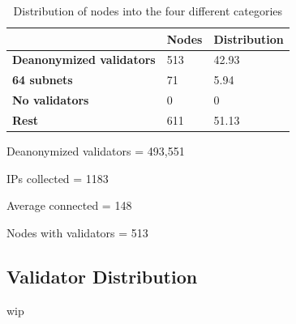 \begin{table}[]
    \centering
    \caption{Distribution of nodes into the four different categories}
    \begin{tabular}{|l|l|l|}
        \hline
        & \textbf{Nodes} & \textbf{Distribution} \\ \hline
        \textbf{Deanonymized validators} & 513            & 42.93                 \\ \hline
        \textbf{64 subnets}              & 71             & 5.94                  \\ \hline
        \textbf{No validators}           & 0              & 0                     \\ \hline
        \textbf{Rest}                    & 611            & 51.13                 \\ \hline
    \end{tabular}
    \label{tab:distribution}
\end{table}


Deanonymized validators = 493,551

IPs collected = 1183

Average connected = 148

Nodes with validators = 513

\subsection{Validator Distribution}\label{subsec:validator-distribution}
wip